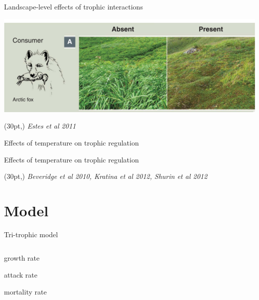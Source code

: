 \documentclass[11pt, compress, aspectratio=1610]{beamer}
\newcommand\smallcitation[1]{%
\begin{textblock*}{\textwidth}(30pt,\textheight)
    \raggedleft \small\textit{#1}
\end{textblock*}}
\providecommand{\tightlist}{%
  \setlength{\itemsep}{0pt}\setlength{\parskip}{0pt}}
\newcommand{\begincols}{\begin{columns}}
\newcommand{\stopcols}{\end{columns}}
\begin{document}
\begin{frame}{Landscape-level effects of trophic interactions}

\centering
 \includegraphics[width=0.7\linewidth]{figuresAz/estes2011.png}\par
\smallcitation{Estes \textit{et al} 2011}

\end{frame}

\begin{frame}{Effects of temperature on trophic regulation}

\centering
 \par

\end{frame}

\begin{frame}{Effects of temperature on trophic regulation}

\centering
\par
\smallcitation{Beveridge et al 2010, Kratina et al 2012, Shurin et al 2012}

\end{frame}

\section{Model}\label{model}

\begin{frame}{Tri-trophic model}

\begincols
  \centering
 \par
 \hfill{}

\begin{description}
\tightlist
\item[\(\mu\)]
growth rate
\item[\(a\)]
attack rate
\item[\(z\)]
mortality rate
\end{description}

\stopcols

\end{frame}
\end{document}
